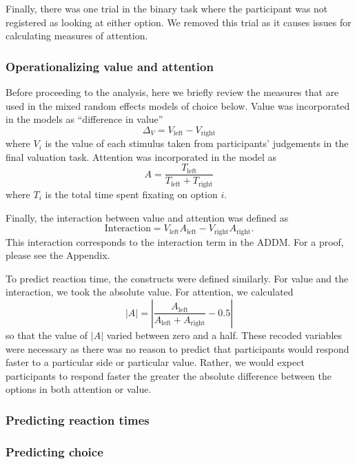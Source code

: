 \documentclass[doc, a4paper, apacite]{apa6}
\begin{document}
Finally, there was one trial in the binary task where the participant was not registered as looking at either option. We removed this trial as it causes issues for calculating measures of attention. 

\subsubsection{Operationalizing value and attention}
Before proceeding to the analysis, here we briefly review the measures that are used in the mixed random effects models of choice below. Value was incorporated in the models as ``difference in value'' 
\begin{equation}
	\Delta_V = V_\text{left} - V_\text{right}
\end{equation}
where $V_i$ is the value of each stimulus taken from participants' judgements in the final valuation task. Attention was incorporated in the model as 
\begin{equation}
	A = \frac{T_\text{left}}{T_\text{left}+T_\text{right}}
\end{equation}
where $T_i$ is the total time spent fixating on option $i$. 

Finally, the interaction between value and attention was defined as
\begin{equation}
	\text{Interaction} = V_\text{left} A_\text{left} - V_\text{right} A_\text{right}.
\end{equation}
This interaction corresponds to the interaction term in the ADDM. For a proof, please see the Appendix. 

To predict reaction time, the constructs were defined similarly. For value and the interaction, we took the absolute value. For attention, we calculated
\begin{equation}
	|A| = \left| \frac{A_\text{left}}{A_\text{left}+A_\text{right}} - 0.5 \right| 
\end{equation}
so that the value of $|A|$ varied between zero and a half. These recoded variables were necessary as there was no reason to predict that participants would respond faster to a particular side or particular value. Rather, we would expect participants to respond faster the greater the absolute difference between the options in both attention or value. 
\subsubsection{Predicting reaction times}

\subsubsection{Predicting choice}
\end{document}
